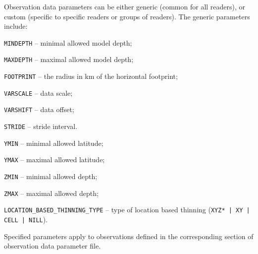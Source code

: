 \documentclass[11pt]{report}
\begin{document}
Observation data parameters can be either generic (common for all readers), or custom (specific to specific readers or groups of readers).
The generic parameters include:
\begin{description}
\item{\verb|MINDEPTH|} -- minimal allowed model depth;
\item{\verb|MAXDEPTH|} -- maximal allowed model depth;
\item{\verb|FOOTPRINT|} -- the radius in km of the horizontal footprint;
\item{\verb|VARSCALE|} -- data scale;
\item{\verb|VARSHIFT|} -- data offset;
\item{\verb|STRIDE|} -- stride interval.
\item{\verb|YMIN|} -- minimal allowed latitude;
\item{\verb|YMAX|} -- maximal allowed latitude;
\item{\verb|ZMIN|} -- minimal allowed depth;
\item{\verb|ZMAX|} -- maximal allowed depth;
\item{\verb|LOCATION_BASED_THINNING_TYPE|} -- type of location based thinning (\verb/XYZ* | XY | CELL | NILL/).
\end{description}
Specified parameters apply to observations defined in the corresponding section of observation data parameter file.
\end{document}
